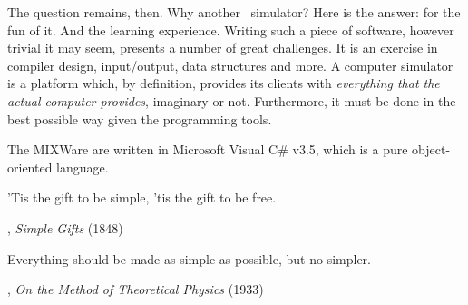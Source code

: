 {The question remains, then. Why another \MIX\ simulator? Here is the answer:
for the fun of it. And the learning experience. Writing such a piece of software,
however trivial it may seem, presents a number of great challenges. It is an
exercise in compiler design, input\slash output, data structures and more.
A computer simulator is a platform which, by definition, provides its clients
with {\it everything that the actual computer provides}, imaginary or not.
Furthermore, it must be done in the best possible way given the programming
tools.

The MIXWare are written in Microsoft Visual C\# v3.5, which is a pure object-oriented
language.

\medskip
{}

}
\endchapter

'Tis the gift to be simple, 'tis the gift to be free.
\author{JOSEPH BRACKETT}, {\sl Simple Gifts} (1848)

\bigskip

Everything should be made as simple as possible,
but no simpler.
\author{ALBERT EINSTEIN}, {\sl On the Method of %
   Theoretical Physics} (1933)
\eject